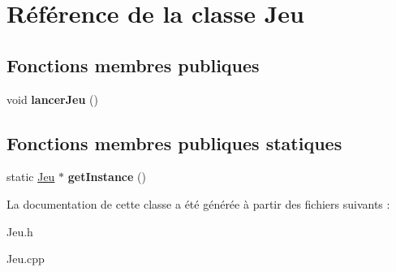 \hypertarget{classJeu}{\section{\-Référence de la classe \-Jeu}
\label{classJeu}
}
\subsection*{\-Fonctions membres publiques}
\begin{DoxyCompactItemize}
\item 
\hypertarget{classJeu_a84033a99b3f0067d65cb3b4760e03ba6}{void {\bfseries lancer\-Jeu} ()}\label{classJeu_a84033a99b3f0067d65cb3b4760e03ba6}

\end{DoxyCompactItemize}
\subsection*{\-Fonctions membres publiques statiques}
\begin{DoxyCompactItemize}
\item 
\hypertarget{classJeu_a7be6cc9a180fd4c1e428ce74ff46e15e}{static \hyperlink{classJeu}{\-Jeu} $\ast$ {\bfseries get\-Instance} ()}\label{classJeu_a7be6cc9a180fd4c1e428ce74ff46e15e}

\end{DoxyCompactItemize}


\-La documentation de cette classe a été générée à partir des fichiers suivants \-:\begin{DoxyCompactItemize}
\item 
\-Jeu.\-h\item 
\-Jeu.\-cpp\end{DoxyCompactItemize}
